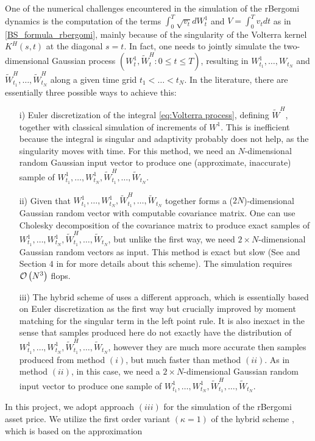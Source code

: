 One of the numerical challenges encountered in the simulation of the rBergomi dynamics  is the computation of the terms  $\int_{0}^{T} \sqrt{v_t} dW_t^1$ and $V=\int_{0}^{T} v_t dt$ as in \eqref{BS_formula_rbergomi}, mainly because of the singularity of the Volterra kernel $K^H(s,t)$ at the diagonal $s = t$. In fact,  one needs to jointly simulate the two-dimensional Gaussian process $(W_t^1, \widetilde{W}^H_t: 0 \le t \le T)$, resulting in $W^1_{t_1},\dots, W_{t_N}$ and $\widetilde{W}^H_{t_1},\dots, \widetilde{W}^H_{t_N}$ along a given time grid $t_1 <\dots < t_N$. In the literature, there are essentially three possible ways to achieve this:
 \begin{enumerate}
 	\item[i)] Euler discretization of the integral \eqref{eq:Volterra process}, defining $\widetilde{W}^H$, together with classical simulation of increments of $W^1$. This is inefficient because the integral is singular and adaptivity probably does not help, as the singularity moves with time. For this method, we need an $N$-dimensional random Gaussian input vector to produce one (approximate, inaccurate) sample of $W^1_{t_1},\dots, W^1_{t_N}, \widetilde{W}^H_{t_1},\dots, \widetilde{W}_{t_N}$.
 	
 	\item[ii)] Given that $W^1_{t_1},\dots, W^1_{t_N}, \widetilde{W}^H_{t_1},\dots, \widetilde{W}_{t_N}$ together forms a ($2N$)-dimensional Gaussian random vector with computable covariance matrix. One can use Cholesky decomposition of the covariance matrix to produce exact samples of $W^1_{t_1},\dots, W^1_{t_N}, \widetilde{W}^H_{t_1},\dots, \widetilde{W}_{t_N}$, but unlike the first way, we need $2 \times N$-dimensional Gaussian random vectors as
 	input. This method is exact but slow (See  \cite{bayer2016pricing} and Section $4$ in \cite{bayer2017short} for more details about this scheme).   The simulation  requires ${\mathcal{O}}\left(N^3\right)$ flops. 
 	
 	\item[iii)]  The hybrid scheme of \cite{bennedsen2017hybrid} uses a different approach, which is essentially based on  Euler discretization as the first way but crucially improved by moment
 	matching for the singular term in the left point rule. It is also
 	inexact in the sense that samples produced here do not exactly have the distribution of $W^1_{t_1},\dots, W^1_{t_N}, \widetilde{W}^H_{t_1},\dots, \widetilde{W}_{t_N}$, however they are much more accurate then samples produced from method $(i)$, but much faster than method $(ii)$. As in method $(ii)$, in this case, we need a $2 \times N$-dimensional Gaussian random input vector to produce one
 	sample of $W^1_{t_1},\dots, W^1_{t_N}, \widetilde{W}^H_{t_1},\dots, \widetilde{W}_{t_N}$.
 \end{enumerate}
In this project, we adopt approach  $(iii)$ for the simulation of the rBergomi asset price. We utilize the first order variant $(\kappa=1) $ of the hybrid scheme \cite{bennedsen2017hybrid}, which is based on the approximation

